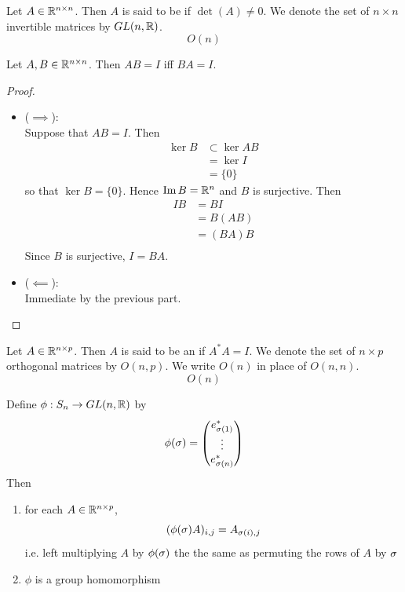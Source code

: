 \documentclass{book}
\begin{document}
	\begin{defn} 
		Let $A \in \mathbb{R}^{n \times n}$. Then $A$ is said to be  if $\det(A) \neq 0$. We denote the set of $n \times n$ invertible matrices by $GL(n, \mathbb{R})$.
		$$O(n)$$
	\end{defn}

	\begin{ex} 
		Let $A,B \in \mathbb{R}^{n \times n}$. Then $AB = I$ iff $BA = I$.
	\end{ex}

	\begin{proof}\
		\begin{itemize}
			\item ($\implies$): \\
			Suppose that $AB = I$. Then  
			\begin{align*}
				\ker B 
				& \subset \ker AB \\
				& = \ker I \\
				& = \{0\}
			\end{align*}
			so that $\ker B = \{0\}$. Hence $\text{Im} \, B = \mathbb{R}^n$ and $B$ is surjective. Then 
			\begin{align*}
				I B
				& = BI \\
				& = B(AB) \\
				& = (BA) B \\
			\end{align*}
			Since $B$ is surjective, $I = BA$. 
			\item ($\impliedby$): \\
			Immediate by the previous part.
		\end{itemize}
	\end{proof}

	\begin{defn} 
		Let $A \in \mathbb{R}^{n \times p}$. Then $A$ is said to be an  if $A^*A = I$. We denote the set of $n \times p$ orthogonal matrices by $O(n, p)$. We write $O(n)$ in place of $O(n, n)$.
		$$O(n)$$
	\end{defn}

	\begin{ex}  
		Define $\phi: S_n \rightarrow GL(n, \mathbb{R})$ by 
		$$\phi(\sigma) = 
		\begin{pmatrix}
			e_{\sigma(1)}^* \\
			\vdots \\
			e_{\sigma(n)}^*
		\end{pmatrix}
		$$
		Then 
		\begin{enumerate}
			\item for each $A \in \mathbb{R}^{n \times p}$, 
			$$ (\phi(\sigma) A)_{i,j}	= A_{\sigma(i), j} $$
			i.e. left multiplying $A$ by $\phi(\sigma)$ the the same as permuting the rows of $A$ by $\sigma$
			\item $\phi$ is a group homomorphism
		\end{enumerate}
	\end{ex}
\end{document}

